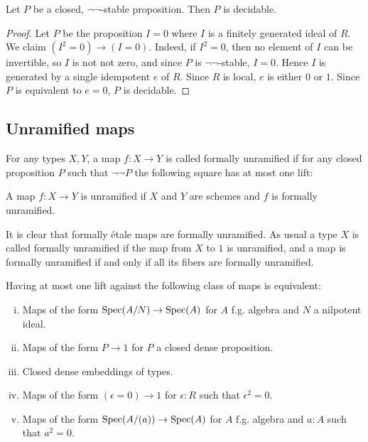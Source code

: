 \begin{proposition}%
	Let $P$ be a closed, $\neg \neg$-stable proposition. Then $P$ is decidable.
\end{proposition}
\begin{proof}
	Let $P$ be the proposition $I = 0$ where $I$ is a finitely generated ideal of $R$.
	We claim $(I^2 = 0) \to (I = 0)$. Indeed, if $I^2 = 0$, then no element of $I$
	can be invertible, so $I$ is not not zero, and since $P$ is $\neg \neg$-stable,
	$I = 0$. Hence $I$ is
	generated by a single idempotent $e$ of $R$.
	Since $R$ is local, $e$ is either $0$ or $1$. Since $P$ is equivalent to $e = 0$,
	$P$ is decidable.
\end{proof}

\subsection{Unramified maps}

\begin{definition}
For any types $X,Y$, a map $f:X\to Y$ is called formally unramified if for any closed proposition $P$ such that $\neg\neg P$ the following square has at most one lift:
 \begin{center}
    \end{center}
\end{definition}

\begin{definition}
A map $f:X\to Y$ is unramified if $X$ and $Y$ are schemes and $f$ is formally unramified.
\end{definition}

It is clear that formally étale maps are formally unramified. As usual a type $X$ is called formally unramified if the map from $X$ to $1$ is unramified, and a map is formally unramified if and only if all its fibers are formally unramified.

\begin{lemma}
\label{equivalence-unramified}
Having at most one lift against the following class of maps is equivalent:
\begin{enumerate}[(i)]
\item Maps of the form $\operatorname{Spec}(A/N)\to \operatorname{Spec}(A)$ for $A$ f.g. algebra and $N$ a nilpotent ideal.
\item Maps of the form $P\to 1$ for $P$ a closed dense proposition.
\item Closed dense embeddings of types.
\item Maps of the form $(\epsilon=0)\to 1$ for $\epsilon:R$ such that $\epsilon^2=0$.
\item Maps of the form $\operatorname{Spec}(A/(a)) \to \operatorname{Spec}(A)$ for $A$ f.g. algebra and $a:A$ such that $a^2=0$.
\end{enumerate}
\end{lemma}

